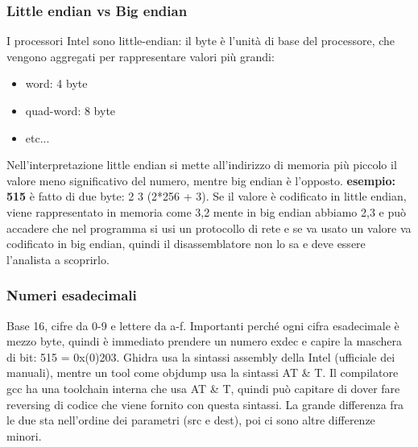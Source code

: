 \documentclass[12pt, oneside]{extbook}
\begin{document}
\subsubsection{Little endian vs Big endian}
I processori Intel sono little-endian: il byte è l'unità di base del processore, che vengono aggregati per rappresentare valori più grandi:
\begin{itemize}
\item word: 4 byte
\item quad-word: 8 byte
\item etc...
\end{itemize}
Nell'interpretazione little endian si mette all'indirizzo di memoria più piccolo il valore meno significativo del numero, mentre big endian è l'opposto. \textbf{esempio: 515} è fatto di due byte: 2 3 (2*256 + 3). Se il valore è codificato in little endian, viene rappresentato in memoria come 3,2 mente in big endian abbiamo 2,3 e può accadere che nel programma si usi un protocollo di rete e se va usato un valore va codificato in big endian, quindi il disassemblatore non lo sa e deve essere l'analista a scoprirlo.
\subsubsection{Numeri esadecimali}
Base 16, cifre da 0-9 e lettere da a-f. Importanti perché ogni cifra esadecimale è mezzo byte, quindi è immediato prendere un numero exdec e capire la maschera di bit: 515 = 0x(0)203. Ghidra usa la sintassi assembly della Intel (ufficiale dei manuali), mentre un tool come objdump usa la sintassi AT \& T. Il compilatore gcc ha una toolchain interna che usa AT \& T, quindi può capitare di dover fare reversing di codice che viene fornito con questa sintassi. La grande differenza fra le due sta nell'ordine dei parametri (src e dest), poi ci sono altre differenze minori.
\end{document}
